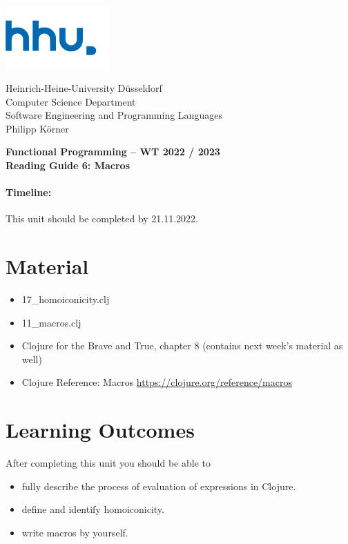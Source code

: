 \documentclass[11pt,a4paper]{article}
\begin{document}
\begin{minipage}[b]{\textwidth}
	\parbox[t]{5cm}{%
		\includegraphics[width=4cm]{unilogo}
		\hfill
	}
	\parbox[b]{11cm}{%
		Heinrich-Heine-University D\"usseldorf\\
		Computer Science Department\\
		Software Engineering and Programming Languages\\
		Philipp K\"orner
	}
\end{minipage}
\begin{center}
	\bf
	Functional Programming -- WT 2022 / 2023\\
	Reading Guide 6: Macros
\end{center}

\pagestyle{empty}

\paragraph{Timeline:} This unit should be completed by 21.11.2022.

\section{Material} 

\begin{itemize}
    \item 17\_homoiconicity.clj
    \item 11\_macros.clj
    \item Clojure for the Brave and True, chapter 8 (contains next week's material as well)
	\item Clojure Reference: Macros \url{https://clojure.org/reference/macros}
\end{itemize}


\section{Learning Outcomes}

After completing this unit you should be able to

\begin{itemize}
	\item fully describe the process of evaluation of expressions in Clojure.
    \item define and identify homoiconicity.
    \item write macros by yourself.
\end{itemize}
\end{document}
